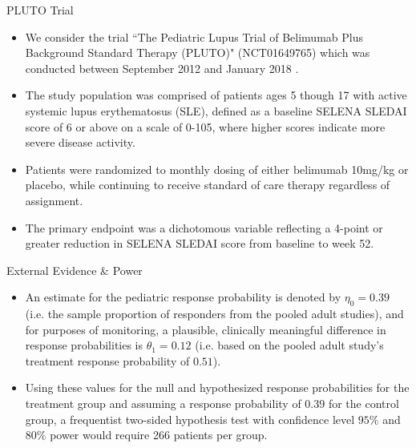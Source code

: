 \documentclass{beamer}
\begin{document}
\begin{frame}{PLUTO Trial}
\begin{itemize}
\item
We consider the trial ``The Pediatric Lupus Trial of Belimumab Plus Background Standard Therapy (PLUTO)" (NCT01649765) which was conducted between September 2012 and January 2018 \citep{Brunner2020}.
\item
The study population was comprised of patients ages 5 though 17 with active systemic lupus erythematosus (SLE), defined as a baseline SELENA SLEDAI score of 6 or above on a scale of 0-105, where higher scores indicate more severe disease activity.
\item
Patients were randomized to monthly dosing of either belimumab 10mg/kg or placebo, while continuing to receive standard of care therapy regardless of assignment.
\item
The primary endpoint was a dichotomous variable reflecting a 4-point or greater reduction in SELENA SLEDAI score from baseline to week 52. 
\end{itemize}
\end{frame}
\begin{frame}{External Evidence \& Power}
\begin{itemize}
\item
An estimate for the pediatric response probability is denoted by $\eta_0=0.39$ (i.e. the sample proportion of responders from the pooled adult studies), and for purposes of monitoring, a plausible, clinically meaningful difference in response probabilities is $\theta_1=0.12$ (i.e. based on the pooled adult study's treatment response probability of $0.51$).
%
\item Using these values for the null and hypothesized response probabilities for the treatment group and assuming a response probability of 0.39 for the control group, a frequentist two-sided hypothesis test with confidence level $95\%$ and $80\%$ power would require 266 patients per group.
\end{itemize}
\end{frame}

\end{document}
